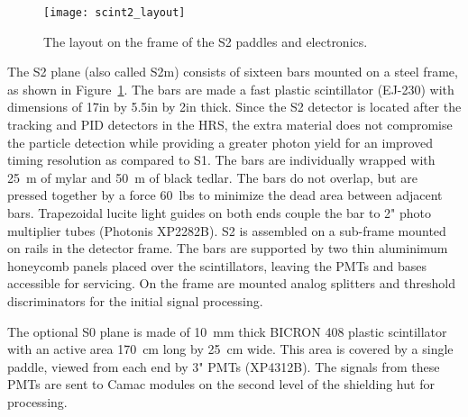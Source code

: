 \begin{figure}[tbh]
  \begin{center}
    \texttt{[image: scint2\_layout]}
    \caption[Detectors: S2 Layout]{The layout on the frame of the S2 paddles and
    electronics.}
    \label{fig:s2layout}
  \end{center}
\end{figure}

The S2 plane (also called S2m) consists of sixteen bars mounted on a steel
frame, as shown in Figure~\ref{fig:s2layout}. The bars are made a fast
plastic scintillator (EJ-230) with dimensions of 17\unit{in} by
5.5\unit{in} by 2\unit{in} thick. Since the S2 detector is located after
the tracking and PID detectors in the HRS, the extra material does not
compromise the particle detection while providing a greater photon yield
for an improved timing resolution as compared to S1. The bars are
individually wrapped with 25\unit{\mu m} of mylar and 50\unit{\mu m} of
black tedlar. The bars do not overlap, but are pressed together by a force
60~lbs to minimize the dead area between adjacent bars. Trapezoidal lucite
light guides on both ends couple the bar to 2" photo multiplier tubes
(Photonis XP2282B). S2 is assembled on a sub-frame mounted on rails in the
detector frame. The bars are supported by two thin aluminimum honeycomb
panels placed over the scintillators, leaving the PMTs and bases accessible
for servicing. On the frame are mounted analog splitters and threshold
discriminators for the initial signal processing.

The optional S0 plane is made of 10~mm thick BICRON 408 plastic
scintillator with an active area 170~cm long by 25~cm wide. This area is
covered by a single paddle, viewed from each end by 3" PMTs (XP4312B). The
signals from these PMTs are sent to Camac modules on the second level of
the shielding hut for processing.

